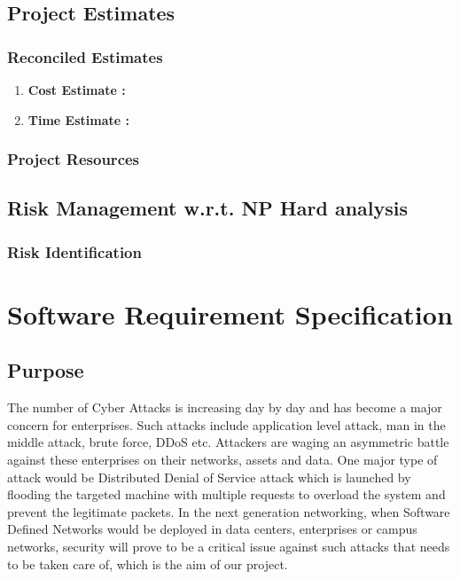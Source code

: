 \documentclass[12pt,a4paper,final]{report}
\begin{document}
\section{Project Estimates}
\subsection{Reconciled Estimates}
\begin{enumerate}
\item
\textbf{
Cost Estimate :
}

\item
\textbf{
Time Estimate :
}
\end{enumerate}

\subsection{Project Resources}

\section{Risk Management w.r.t. NP Hard analysis}
\subsection{Risk Identification}
\newpage

\chapter{Software Requirement Specification}
\thispagestyle{empty}
\newpage
\section{Purpose}
The number of Cyber Attacks is increasing day by day and has become a major concern for enterprises. Such attacks include application level attack, man in the middle attack, brute force, DDoS etc. Attackers are waging an asymmetric battle against these enterprises on their networks, assets and data. One major type of attack would be Distributed Denial of Service attack which is launched by flooding the targeted machine with multiple requests to overload the system and prevent the legitimate packets. In the next generation networking, when Software Defined Networks would be deployed in data centers, enterprises or campus networks, security will prove to be a critical issue against such attacks that needs to be taken care of, which is the aim of our project.
\end{document}
